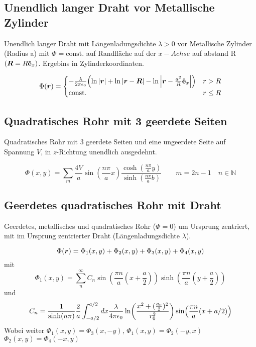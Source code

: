     \newpage
    \subsection{Unendlich langer Draht vor Metallische Zylinder}
    Unendlich langer Draht mit Längenladungsdichte $\lambda>0$ vor
    Metallische Zylinder (Radius a) 
    mit $\Phi=\text{const.}$ auf Randfläche auf 
    der $x-Achse$ auf abstand R $(\vb* R = R{\vu{e}}_{x})$. Ergebins in
    Zylinderkoordinaten.
   
    \begin{equation}
      \Phi(\vb*r)=
      \begin{cases}
        -\frac{\lambda}{2\pi\epsilon_0}
        \qty(\ln\abs{\vb*r}+\ln\abs{\vb*r-\vb*R}
        -\ln\abs{\vb*r- \frac{a^2}{R}{\vu{e}}_{x}})& r > R\\
        \text{const.}         & r\le R 
      \end{cases}
    \end{equation}

    \subsection{Quadratisches Rohr mit 3 geerdete Seiten}
    Quadratisches Rohr mit 3 geerdete Seiten und eine ungeerdete Seite auf
    Spannung $V$, in $z$-Richtung unendlich ausgedehnt.

    \begin{equation}
      \Phi(x,y)=\sum_{m} \frac{4V}{a} \sin(\frac{n\pi}{a} x)
      \frac{\cosh(\frac{n\pi}{a}y)}{\sinh(\frac{n\pi}{a} b)} 
      \qquad m=2n-1\quad n\in\mathbb{N}
    \end{equation}

    \subsection{Geerdetes quadratisches Rohr mit Draht}
    Geerdetes, metallisches und quadratisches 
    Rohr ($\Phi=0$) um Ursprung zentriert, mit im Ursprung zentrierter
    Draht (Längenladungsdichte $\lambda$).

    \begin{equation}
      \Phi(\vb*r)=\Phi_1(x,y)+\Phi_2(x,y)+\Phi_3(x,y)+\Phi_4(x,y)
    \end{equation}
    mit
    \begin{equation*}
      \Phi_1(x,y)=\sum_n^\infty C_n 
      \sin(\frac{\pi n}{a} (x+\frac{a}{2}))
      \sinh(\frac{\pi n}{a} (y+\frac{a}{2}))
    \end{equation*}
    und
    \begin{equation*}
      C_n = \frac{1}{\sinh(n\pi)}\frac{2}{a} \int_{-a/2}^{a/2}dx
      \frac{\lambda}{4\pi\epsilon_0}\ln(\frac{x^2+(\frac{a_0}{2})^2}
      {r_0^2})\sin(\frac{\pi n}{a}\qty(x+a/2))
    \end{equation*}
    Wobei weiter $\Phi_1(x,y)=\Phi_3(x,-y)$, $\Phi_1(x,y)=\Phi_2(-y,x)$
    $\Phi_2(x,y)=\Phi_4(-x,y)$

